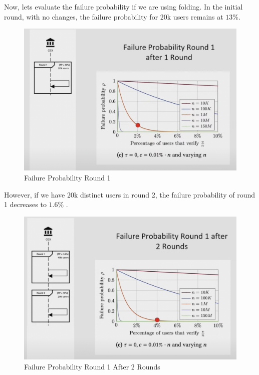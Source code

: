 Now, lets evaluate the failure probability if we are using folding.
In the initial round, with no changes, the failure probability for 20k users remains at $13\%$.

\begin{figure}[H]
   \centering
   \includegraphics[width=130mm]{FailureProbabilityRound1.png}
   \caption{Failure Probability Round 1 \cite{NS23}}
   \label{overflow}
   \end{figure}

However, if we have 20k distinct users in round 2, the failure probability of round 1 decreases to $1.6\%$ .

\begin{figure}[H]
   \centering
   \includegraphics[width=130mm]{FailureProbabilityRound2.png}
   \caption{Failure Probability Round 1 After 2 Rounds\cite{NS23}}
   \label{overflow}
   \end{figure}

